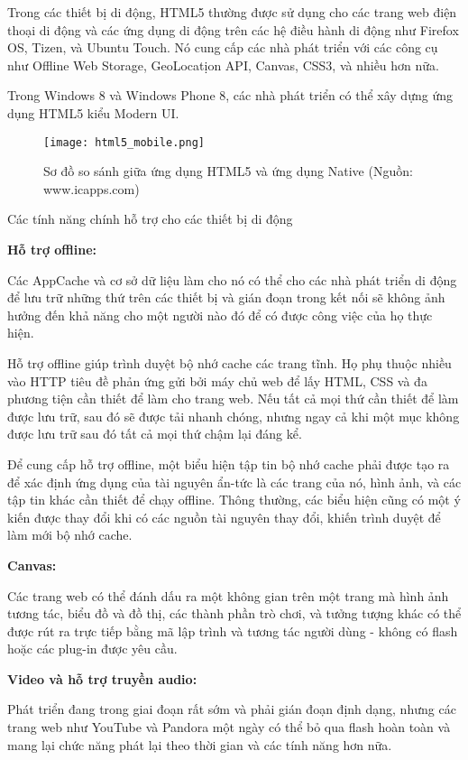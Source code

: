 Trong các thiết bị di động, HTML5 thường được sử dụng cho các trang web điện thoại di động và các ứng dụng di động trên các hệ điều hành di động như Firefox OS, Tizen, và Ubuntu Touch. Nó cung cấp các nhà phát triển với các công cụ như Offline Web Storage, GeoLocatịon API, Canvas, CSS3, và nhiều hơn nữa.

Trong Windows 8 và Windows Phone 8, các nhà phát triển có thể xây dựng ứng dụng HTML5 kiểu Modern UI.

\begin{figure}[!htb] 
\centering
\texttt{[image: html5\_mobile.png]}
\caption{Sơ đồ so sánh giữa ứng dụng HTML5 và ứng dụng Native (Nguồn: www.icapps.com)}
\end{figure}

Các tính năng chính hỗ trợ cho các thiết bị di động

\textbf{Hỗ trợ offline:}

Các AppCache và cơ sở dữ liệu làm cho nó có thể cho các nhà phát triển di động để lưu trữ những thứ trên các thiết bị và gián đoạn trong kết nối sẽ không ảnh hưởng đến khả năng cho một người nào đó để có được công việc của họ thực hiện.

Hỗ trợ offline giúp trình duyệt bộ nhớ cache các trang tĩnh. Họ phụ thuộc nhiều vào HTTP tiêu đề phản ứng gửi bởi máy chủ web để lấy HTML, CSS và đa phương tiện cần thiết để làm cho trang web. Nếu tất cả mọi thứ cần thiết để làm được lưu trữ, sau đó sẽ được tải nhanh chóng, nhưng ngay cả khi một mục không được lưu trữ sau đó tất cả mọi thứ chậm lại đáng kể.

Để cung cấp hỗ trợ offline, một biểu hiện tập tin bộ nhớ cache phải được tạo ra để xác định ứng dụng của tài nguyên ẩn-tức là các trang của nó, hình ảnh, và các tập tin khác cần thiết để chạy offline. Thông thường, các biểu hiện cũng có một ý kiến được thay đổi khi có các nguồn tài nguyên thay đổi, khiến trình duyệt để làm mới bộ nhớ cache.

\textbf{Canvas:}

Các trang web có thể đánh dấu ra một không gian trên một trang mà hình ảnh tương tác, biểu đồ và đồ thị, các thành phần trò chơi, và tưởng tượng khác có thể được rút ra trực tiếp bằng mã lập trình và tương tác người dùng - không có flash hoặc các plug-in được yêu cầu.

\textbf{Video và hỗ trợ truyền audio:}

Phát triển đang trong giai đoạn rất sớm và phải gián đoạn định dạng, nhưng các trang web như YouTube và Pandora một ngày có thể bỏ qua flash hoàn toàn và mang lại chức năng phát lại theo thời gian và các tính năng hơn nữa.

